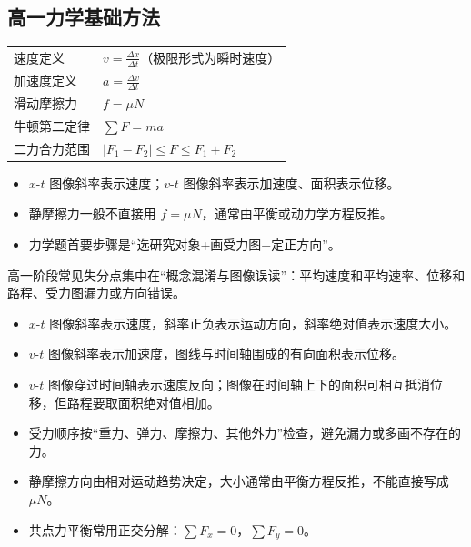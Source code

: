 \subsection{高一力学基础方法}
\begin{tabularx}{\columnwidth}{XX}
  速度定义 & $v=\frac{\Delta x}{\Delta t}$（极限形式为瞬时速度） \\
  加速度定义 & $a=\frac{\Delta v}{\Delta t}$ \\
  滑动摩擦力 & $f=\mu N$ \\
  牛顿第二定律 & $\sum F=ma$ \\
  二力合力范围 & $|F_1-F_2|\le F\le F_1+F_2$ \\
\end{tabularx}

\begin{formulanotebox}
\begin{itemize}[leftmargin=1.5em]
  \item $x$-$t$ 图像斜率表示速度；$v$-$t$ 图像斜率表示加速度、面积表示位移。
  \item 静摩擦力一般不直接用 $f=\mu N$，通常由平衡或动力学方程反推。
  \item 力学题首要步骤是“选研究对象+画受力图+定正方向”。
\end{itemize}
\end{formulanotebox}

\begin{keypointbox}
高一阶段常见失分点集中在“概念混淆与图像误读”：平均速度和平均速率、位移和路程、受力图漏力或方向错误。
\end{keypointbox}

\begin{casetypebox}[title={\strut\textcolor{white}{\bfseries 常见题型：运动图像判读}}]
\begin{itemize}[leftmargin=1.5em]
  \item $x$-$t$ 图像斜率表示速度，斜率正负表示运动方向，斜率绝对值表示速度大小。
  \item $v$-$t$ 图像斜率表示加速度，图线与时间轴围成的有向面积表示位移。
  \item $v$-$t$ 图像穿过时间轴表示速度反向；图像在时间轴上下的面积可相互抵消位移，但路程要取面积绝对值相加。
\end{itemize}
\end{casetypebox}

\begin{casetypebox}[title={\strut\textcolor{white}{\bfseries 常见题型：受力分析与平衡}}]
\begin{itemize}[leftmargin=1.5em]
  \item 受力顺序按“重力、弹力、摩擦力、其他外力”检查，避免漏力或多画不存在的力。
  \item 静摩擦方向由相对运动趋势决定，大小通常由平衡方程反推，不能直接写成 $\mu N$。
  \item 共点力平衡常用正交分解：$\sum F_x=0$，$\sum F_y=0$。
\end{itemize}
\end{casetypebox}

